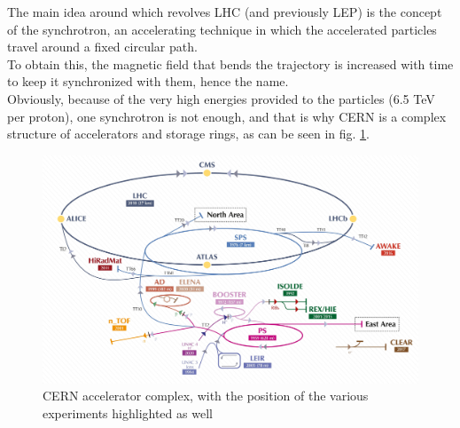 The main idea around which revolves LHC (and previously LEP) is the concept of the synchrotron, an accelerating technique in which the accelerated particles travel around a fixed circular path.\\
To obtain this, the magnetic field that bends the trajectory is increased with time to keep it synchronized with them, hence the name.\\
Obviously, because of the very high energies provided to the particles (6.5 TeV per proton), one synchrotron is not enough, and that is why CERN is a complex structure of accelerators and storage rings, as can be seen in fig. \ref{cern_complex}.
\begin{figure}
    \centering\includegraphics[width=\textwidth]{images/CERN_accelerator_complex.jpg}
    \caption{CERN accelerator complex, with the position of the various experiments highlighted as well}
    \label{cern_complex}
\end{figure}

